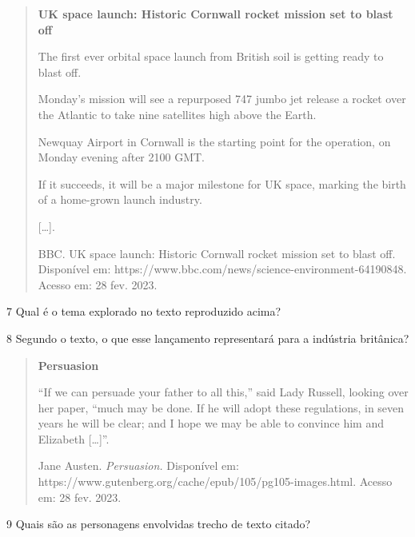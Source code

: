 \begin{quote}
\textbf{UK space launch: Historic Cornwall rocket mission set to blast off}

The first ever orbital space launch from British soil is getting ready
to blast off.

Monday's mission will see a repurposed 747 jumbo jet release a rocket
over the Atlantic to take nine satellites high above the Earth.

Newquay Airport in Cornwall is the starting point for the operation, on
Monday evening after 2100 GMT.

If it succeeds, it will be a major milestone for UK space, marking the
birth of a home-grown launch industry.

{[}\ldots{}{]}.

BBC. UK space launch: Historic Cornwall rocket mission set to blast off.
Disponível em: https://www.bbc.com/news/science-environment-64190848.
Acesso em: 28 fev. 2023.
\end{quote}

\num{7} Qual é o tema explorado no texto reproduzido acima?

\linhas[2]


\num{8} Segundo o texto, o que esse lançamento representará para a indústria britânica?

\linhas[3]



\begin{quote}
\textbf{Persuasion}

``If we can persuade your father to all this,'' said Lady Russell,
looking over her paper, ``much may be done. If he will adopt these
regulations, in seven years he will be clear; and I hope we may be able
to convince him and Elizabeth {[}\ldots{}{]}''.

Jane Austen. \emph{Persuasion.} Disponível em:
https://www.gutenberg.org/cache/epub/105/pg105-images.html. Acesso em:
28 fev. 2023.
\end{quote}

\num{9} Quais são as personagens envolvidas trecho de texto citado?

\linhas[2]

